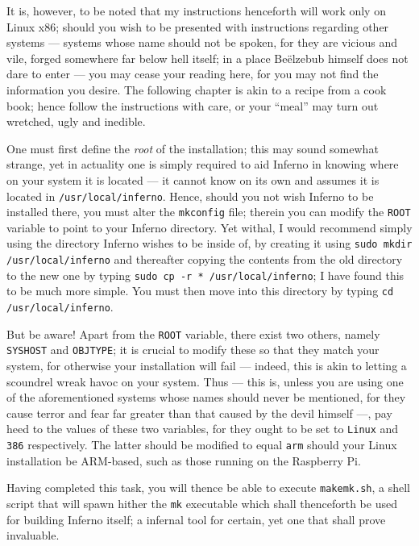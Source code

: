 \documentclass[a5paper,twoside,12pt]{report}
\begin{document}
It is, however, to be noted that my instructions henceforth will work only on Linux x86; should you wish to be presented with instructions regarding other systems — systems whose name should not be spoken, for they are vicious and vile, forged somewhere far below hell itself; in a place Be\"{e}lzebub himself does not dare to enter — you may cease your reading here, for you may not find the information you desire. The following chapter is akin to a recipe from a cook book; hence follow the instructions with care, or your ``meal'' may turn out wretched, ugly and inedible.

One must first define the \textit{root} of the installation; this may sound somewhat strange, yet in actuality one is simply required to aid Inferno in knowing where on your system it is located — it cannot know on its own and assumes it is located in \texttt{/usr/local/inferno}. Hence, should you not wish Inferno to be installed there, you must alter the \texttt{mkconfig} file; therein you can modify the \texttt{ROOT} variable to point to your Inferno directory.
Yet withal, I would recommend simply using the directory Inferno wishes to be inside of, by creating it using \texttt{sudo mkdir /usr/local/inferno} and thereafter copying the contents from the old directory to the new one by typing \texttt{sudo cp -r * /usr/local/inferno}; I have found this to be much more simple. You must then move into this directory by typing \texttt{cd /usr/local/inferno}.

But be aware! Apart from the \texttt{ROOT} variable, there exist two others, namely \texttt{SYSHOST} and \texttt{OBJTYPE}; it is crucial to modify these so that they match your system, for otherwise your installation will fail — indeed, this is akin to letting a scoundrel wreak havoc on your system. Thus — this is, unless you are using one of the aforementioned systems whose names should never be mentioned, for they cause terror and fear far greater than that caused by the devil himself —, pay heed to the values of these two variables, for they ought to be set to \texttt{Linux} and \texttt{386} respectively. The latter should be modified to equal \texttt{arm} should your Linux installation be ARM-based, such as those running on the Raspberry Pi.

Having completed this task, you will thence be able to execute \texttt{makemk.sh}, a shell script that will spawn hither the \texttt{mk} executable which shall thenceforth be used for building Inferno itself; a infernal tool for certain, yet one that shall prove invaluable.
\end{document}
